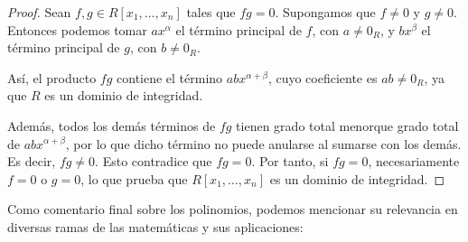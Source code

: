 \begin{definicion}
\end{definicion}






\begin{proposicion}
\end{proposicion}




\begin{proof}
	Sean \( f, g \in R[x_1, \dots, x_n] \) tales que \( fg = 0 \). Supongamos que \( f \neq 0 \) y \( g \neq 0 \). Entonces podemos tomar \( ax^{\alpha} \) el término principal de \( f \), con \( a \neq 0_R \), y \( bx^{\beta} \) el término principal de \( g \), con \( b \neq 0_R \).
	
		\medskip
	\noindent
	Así, el producto \( fg \) contiene el término \( abx^{\alpha + \beta} \), cuyo coeficiente es \( ab \neq 0_R \), ya que \( R \) es un dominio de integridad.
	
		\medskip
	\noindent
	Además, todos los demás términos de \( fg \) tienen grado total menorque grado total de \( abx^{\alpha + \beta} \), por lo que dicho término no puede anularse al sumarse con los demás. Es decir, $fg\neq 0$. Esto contradice que \( fg = 0 \). Por tanto, si \( fg = 0 \), necesariamente \( f = 0 \) o \( g = 0 \), lo que prueba que \( R[x_1, \dots, x_n] \) es un dominio de integridad.
\end{proof}

\vspace{0.5cm}
Como comentario final sobre los polinomios, podemos mencionar su relevancia en diversas ramas de las matemáticas y sus aplicaciones:

